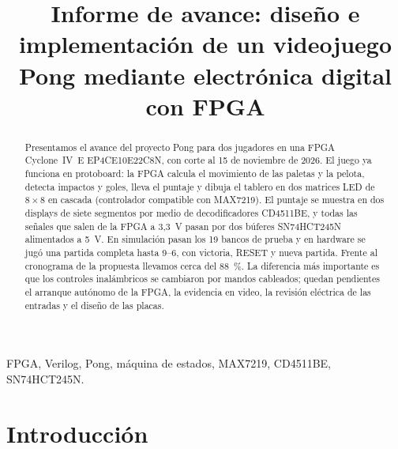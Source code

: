 \documentclass[conference,a4paper]{IEEEtran}
\begin{document}
\title{Informe de avance: diseño e implementación de un videojuego Pong mediante electrónica digital con FPGA}

\author{
}

\maketitle

\begin{abstract}
Presentamos el avance del proyecto Pong para dos jugadores en una FPGA Cyclone~IV~E EP4CE10E22C8N, con corte al 15 de noviembre de 2026. El juego ya funciona en protoboard: la FPGA calcula el movimiento de las paletas y la pelota, detecta impactos y goles, lleva el puntaje y dibuja el tablero en dos matrices LED de $8\times8$ en cascada (controlador compatible con MAX7219). El puntaje se muestra en dos displays de siete segmentos por medio de decodificadores CD4511BE, y todas las señales que salen de la FPGA a 3,3~V pasan por dos búferes SN74HCT245N alimentados a 5~V. En simulación pasan los 19 bancos de prueba y en hardware se jugó una partida completa hasta 9--6, con victoria, RESET y nueva partida. Frente al cronograma de la propuesta llevamos cerca del 88~\%. La diferencia más importante es que los controles inalámbricos se cambiaron por mandos cableados; quedan pendientes el arranque autónomo de la FPGA, la evidencia en video, la revisión eléctrica de las entradas y el diseño de las placas.
\end{abstract}

\begin{IEEEkeywords}
FPGA, Verilog, Pong, máquina de estados, MAX7219, CD4511BE, SN74HCT245N.
\end{IEEEkeywords}

\section{Introducción}
\end{document}
